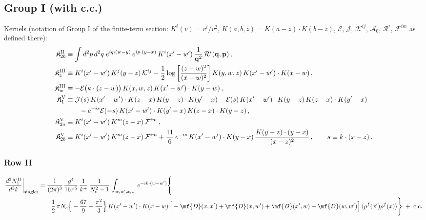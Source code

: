 \subsection{Group I (with c.c.)}
\noindent Kernels (notation of Group I of the finite-term section: $K^{i}(v)=v^{i}/v^{2}$, $K(a,b,z)=K(a-z)\cdot K(b-z)$, $\mathcal{E}$, $\mathcal{J}$, $\mathcal{K}^{ij}$, $\mathcal{A}_{0}$, $\mathcal{R}^{i}$, $\mathcal{F}^{im}$ as defined there):
\begin{align}
\mathfrak{K}^{\rm II}_{2b}&\equiv\int d^{2}p\,d^{2}q\;e^{iq\cdot(w-y)}\,e^{ip\cdot(y-x)}\,K^{i}(x'-w')\,\frac{1}{\mathbf{q}^{2}}\,\mathcal{R}^{i}(\mathbf{q},\mathbf{p})\,,\notag\\
\mathfrak{K}^{\rm III}_{z}&\equiv K^{i}(x'-w')\,K^{j}(y-z)\,\mathcal{K}^{ij}-\frac12\log\left[\frac{(z-w)^{2}}{(x-w)^{2}}\right]K(y,w,z)\,K(x'-w')\cdot K(x-w)\,,\notag\\
\mathfrak{K}^{\rm III}_{w}&\equiv-\mathcal{E}\big(k\cdot(z-w)\big)\,K(x,w,z)\,K(x'-w')\cdot K(y-w)\,,\notag\\
\mathfrak{K}^{\rm V}_{1}&\equiv\mathcal{J}(s)\,K(x'-w')\cdot K(z-x)\,K(y-z)\cdot K(y'-x)-\mathcal{E}(s)\,K(x'-w')\cdot K(y-z)\,K(z-x)\cdot K(y'-x)\notag\\&\qquad-e^{-is}\mathcal{E}(-s)\,K(x'-w')\cdot K(y'-x)\,K(z-x)\cdot K(y-z)\,,\notag\\
\mathfrak{K}^{\rm V}_{2a}&\equiv K^{i}(x'-w')\,K^{m}(z-x)\,\mathcal{F}^{im}\,,\notag\\
\mathfrak{K}^{\rm V}_{2b}&\equiv K^{i}(x'-w')\,K^{m}(z-x)\,\mathcal{F}^{im}+\frac{11}{6}\,e^{-is}\,K(x'-w')\cdot K(y-x)\,\frac{K(y-z)\cdot(y-x)}{(x-z)^{2}}\,,\qquad s\equiv k\cdot(x-z)\,.\notag
\end{align}

\subsubsection*{Row II}

\begin{align}
\frac{d^{3}N_{1}^{\rm II}}{d^{3}k}\bigg|_{\rm singlet}&=\frac{1}{(2\pi)^{3}}\,\frac{g^{4}}{16\pi^{5}}\,\frac{1}{k^{+}}\,\frac{1}{N_{c}^{2}-1}\,\int_{w,w',x,x'}e^{-ik\cdot(w-w')}\Bigg\{\notag\\
&\qquad \frac{1}{2}\,\pi N_{c}\Big\{-\frac{67}{9}+\frac{\pi^{2}}{3}\Big\}\,K(x'-w')\cdot K(x-w)\,\Big[-\mf{D}(x,x')+\mf{D}(x,w')+\mf{D}(x',w)-\mf{D}(w,w')\Big]\,\langle\rho^{f}(x')\rho^{f}(x)\rangle\Bigg\}\;+\;{\rm c.c.}\label{eq:s-I-II-1}
\end{align}

